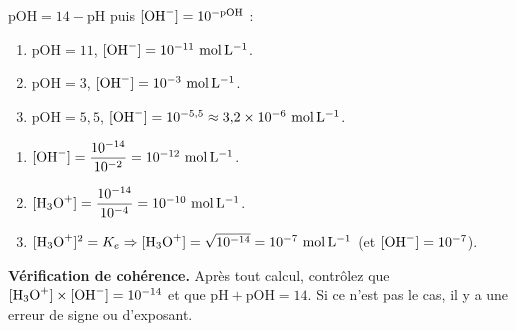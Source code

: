 \documentclass[11pt,a4paper]{article}
\begin{document}
\begin{corrbox}[passer par $\mathrm{pH}+\mathrm{pOH}=14$]
$\mathrm{pOH}=14-\mathrm{pH}$ puis $[\ce{OH-}]=10^{-\mathrm{pOH}}$ :
\begin{enumerate}[label=\alph*),leftmargin=1.6em,itemsep=1pt]
  \item $\mathrm{pOH}=11$, $[\ce{OH-}]=10^{-11}\ \si{mol.L^{-1}}$.
  \item $\mathrm{pOH}=3$, $[\ce{OH-}]=10^{-3}\ \si{mol.L^{-1}}$.
  \item $\mathrm{pOH}=5{,}5$, $[\ce{OH-}]=10^{-5{,}5}\approx 3{,}2\times10^{-6}\ \si{mol.L^{-1}}$.
\end{enumerate}
\end{corrbox}

\begin{corrbox}
\begin{enumerate}[label=\alph*),leftmargin=1.6em,itemsep=1pt]
  \item $[\ce{OH-}] = \dfrac{10^{-14}}{10^{-2}} = 10^{-12}\ \si{mol.L^{-1}}$.
  \item $[\ce{H3O+}] = \dfrac{10^{-14}}{10^{-4}} = 10^{-10}\ \si{mol.L^{-1}}$.
  \item $[\ce{H3O+}]^2 = K_e \Rightarrow [\ce{H3O+}] = \sqrt{10^{-14}} = 10^{-7}\ \si{mol.L^{-1}}$
        (et $[\ce{OH-}]=10^{-7}$).
\end{enumerate}
\end{corrbox}

\begin{astuce}
\textbf{Vérification de cohérence.} Après tout calcul, contrôlez que
$[\ce{H3O+}]\times[\ce{OH-}] = 10^{-14}$ et que $\mathrm{pH}+\mathrm{pOH}=14$. Si ce n'est pas le cas, il y a
une erreur de signe ou d'exposant.
\end{astuce}
\end{document}
